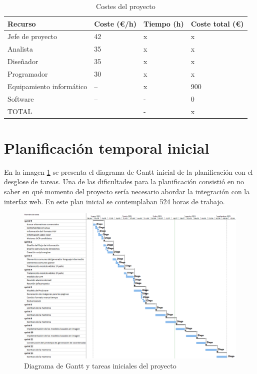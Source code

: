 \begin{table}[ht]
    \centering
    \begin{tabular}{l l l l}
        Recurso & Coste (€/h) & Tiempo (h) & Coste total (€) \\
        \hline
        \hline
        Jefe de proyecto & 42 & x & x \\
        Analista & 35 & x & x \\
        Diseñador & 35 & x & x \\
        Programador & 30 & x & x \\
        Equipamiento informático & -- & x & 900 \\
        Software & -- & - & 0 \\        
        \hline
        \hline
        TOTAL & & - & x \\        
    \end{tabular}
    \label{Tab:costes-proyecto}
    \caption{Costes del proyecto}
\end{table}

\section{Planificación temporal inicial}

En la imagen \ref{fig:gantt-inicial} se presenta el diagrama de Gantt inicial de la planificación con el desglose de tareas. Una de las dificultades para la planificación consistió en no saber en qué momento del proyecto sería necesario abordar la integración con la interfaz web. En este plan inicial se contemplaban 524 horas de trabajo.

\begin{figure}[hp!]
    \centering
    \includegraphics[angle=90,width=1.0\textwidth]{imaxes/f-planificacion/gantt-inicial.png}
    \caption{Diagrama de Gantt y tareas iniciales del proyecto}
    \label{fig:gantt-inicial}
\end{figure}

